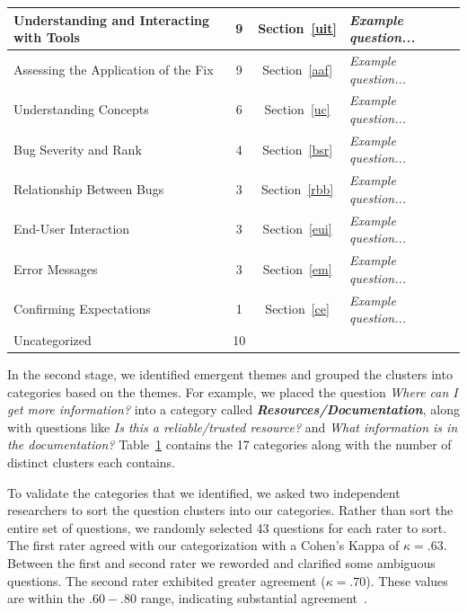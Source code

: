 \documentclass[conference]{IEEEtran}
\begin{document}
\begin{table}
\begin{tabular}{|l|c|c|l|}
    Understanding and Interacting with Tools			& 9     	& Section~\ref{uit}				& \emph{Example question...}			\\
    \hline
    Assessing the Application of the Fix				& 9     	& Section~\ref{aaf}				& \emph{Example question...}			\\
    \hline
    Understanding Concepts								& 6 		& Section~\ref{uc}				& \emph{Example question...}				\\
    \hline
    Bug Severity and Rank								& 4     	& Section~\ref{bsr}				& \emph{Example question...}			\\
    \hline
    Relationship Between Bugs							& 3     	& Section~\ref{rbb}				& \emph{Example question...}			\\
    \hline
    End-User Interaction								& 3     	& Section~\ref{eui}				& \emph{Example question...}		\\
    \hline
    Error Messages										& 3     	& Section~\ref{em}				& \emph{Example question...}			\\
    \hline
    Confirming Expectations					 			& 1			& Section~\ref{ce}				& \emph{Example question...}   \\
    \hline
    Uncategorized										& 10    	&						& \emph{} \\
    \hline
\end{tabular}
\label{table:categories}
\end{table}


In the second stage, we identified emergent themes and grouped the clusters into categories based on the themes. 
For example, we placed the question \textit{Where can I get more information?} into a category called \emph{\textbf{Resources/Documentation}}, along with questions like \textit{Is this a reliable/trusted resource?} and \textit{What information is in the documentation?} 
Table~\ref{table:categories} contains the 17 categories along with the number of distinct clusters each contains. 

To validate the categories that we identified, we asked two independent researchers to sort the question clusters into our categories. 
Rather than sort the entire set of questions, we randomly selected 43 questions for each rater to sort.
The first rater agreed with our categorization with a Cohen's Kappa of $\kappa = .63$. 
Between the first and second rater we reworded and clarified some ambiguous questions. The second rater exhibited greater agreement ($\kappa = .70$). 
These values are within the $.60 - .80$ range, indicating substantial agreement~\cite{Landis1977agreement}.
\end{document}
